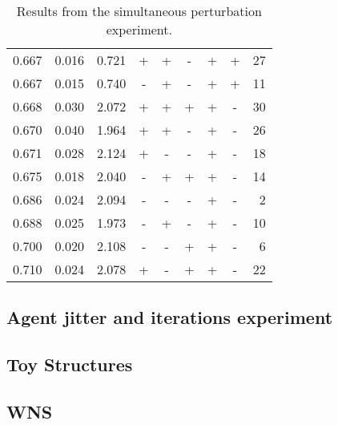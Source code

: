 \documentclass[11pt]{article}
\begin{document}
\begin{table}[ht]
\begin{tabular}{rrrcccccr}
  0.667 & 0.016 & 0.721 & + & + & - & + & + & 27 \\ 
  0.667 & 0.015 & 0.740 & - & + & - & + & + & 11 \\ 
  0.668 & 0.030 & 2.072 & + & + & + & + & - & 30 \\ 
  0.670 & 0.040 & 1.964 & + & + & - & + & - & 26 \\ 
  0.671 & 0.028 & 2.124 & + & - & - & + & - & 18 \\ 
  0.675 & 0.018 & 2.040 & - & + & + & + & - & 14 \\ 
  0.686 & 0.024 & 2.094 & - & - & - & + & - & 2 \\ 
  0.688 & 0.025 & 1.973 & - & + & - & + & - & 10 \\ 
  0.700 & 0.020 & 2.108 & - & - & + & + & - & 6 \\ 
  0.710 & 0.024 & 2.078 & + & - & + & + & - & 22 \\ 
   \hline
\end{tabular}
\caption{Results from the simultaneous perturbation experiment.} 
\end{table}


\subsection{Agent jitter and iterations experiment}
\label{sec-5-2}

\subsection{Toy Structures}
\label{sec-5-3}

\subsection{WNS}
\label{sec-5-4}
\end{document}
